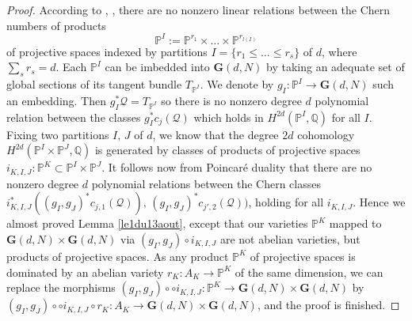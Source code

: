 \documentclass[10pt]{article}
\begin{document}
\begin{proof} According to \cite{milnor}, \cite{thom}, there are no nonzero linear relations between the Chern numbers
of products  $$\mathbb{P}^I:=\mathbb{P}^{r_1}\times\ldots\times\mathbb{P}^{r_{l(I)}}$$
of projective spaces indexed by partitions $I=\{r_1\leq\ldots\leq r_s\}$ of $d$, where $\sum _sr_s=d$.
Each $\mathbb{P}^I$ can be imbedded into $\mathbf{G}(d,N)$ by taking an adequate set of global sections of its tangent bundle $T_{\mathbb{P}^I}$. We denote by $g_I:\mathbb{P}^I\rightarrow \mathbf{G}(d,N)$ such an embedding. Then
$g_I^*\mathcal{Q}=T_{\mathbb{P}^I}$ so there is  no nonzero degree $d$ polynomial relation between the classes
$g_I^*c_j(\mathcal{Q})$ which holds in $H^{2d}(\mathbb{P}^I,\mathbb{Q})$  for all $I$.
Fixing two partitions $I,\,J$ of $d$, we know that the degree $2d$ cohomology $H^{2d}(\mathbb{P}^I\times \mathbb{P}^J,\mathbb{Q})$ is generated by classes of products of projective spaces $i_{K,I,J}:\mathbb{P}^K\subset \mathbb{P}^I\times \mathbb{P}^J$.
It follows now from Poincaré duality that there are no nonzero degree $d$ polynomial relations between the Chern classes $i_{K,I,J}^*((g_I,g_J)^*c_{j,1}(\mathcal{Q})),\,(g_I,g_J)^*c_{j',2}(\mathcal{Q}))$, holding for all $i_{K,I,J}$. Hence we almost proved   Lemma \ref{le1du13aout}, except that our varieties $\mathbb{P}^K$ mapped to $\mathbf{G}(d,N)\times \mathbf{G}(d,N)$ via  $(g_I,g_J)\circ i_{K,I,J}$ are not abelian varieties, but products of projective spaces. As any product $\mathbb{P}^K$ of projective spaces  is dominated by an abelian variety $r_K:A_K\rightarrow \mathbb{P}^K$ of the same dimension, we can replace the morphisms $(g_I,g_J)\circ \circ i_{K,I,J}: \mathbb{P}^K\rightarrow \mathbf{G}(d,N)\times \mathbf{G}(d,N)$ by $(g_I,g_J)\circ \circ i_{K,I,J}\circ r_K:A_K\rightarrow \mathbf{G}(d,N)\times \mathbf{G}(d,N)$, and the proof is finished.
\end{proof}
\end{document}

